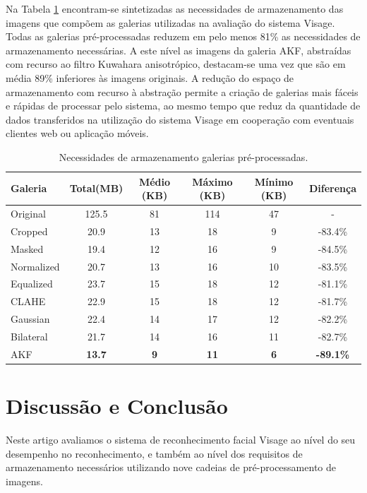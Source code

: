 \documentclass{llncs}
\begin{document}
Na Tabela \ref{tab:tamanho} encontram-se sintetizadas as necessidades de armazenamento das imagens que compõem as galerias utilizadas na avaliação do sistema Visage. Todas as galerias pré-processadas reduzem em pelo menos 81\% as necessidades de armazenamento necessárias. A este nível as imagens da galeria AKF, abstraídas com recurso ao filtro Kuwahara anisotrópico, destacam-se uma vez que são em média 89\% inferiores às imagens originais. A redução do espaço de armazenamento com recurso à abstração permite a criação de galerias mais fáceis e rápidas de processar pelo sistema, ao mesmo tempo que reduz da quantidade de dados transferidos na utilização do sistema Visage em cooperação com eventuais clientes web ou aplicação móveis.
\begin{table}
	\centering
    \caption{Necessidades de armazenamento galerias pré-processadas.}
    \begin{tabular}{l|ccccc}
    Galeria    & Total(MB) & Médio (KB) & Máximo (KB) & Mínimo (KB) & Diferença \\ 
    \hline\hline
    Original   & 125.5   & 81 & 114 & 47 & - \\

    Cropped    & 20.9   & 13 & 18 & 9 & -83.4\% \\
    Masked     & 19.4   & 12 & 16 & 9 & -84.5\% \\  

    Normalized & 20.7   & 13 & 16 & 10& -83.5\% \\  
    Equalized  & 23.7   & 15 & 18 & 12& -81.1\% \\  
    CLAHE      & 22.9   & 15 & 18 & 12& -81.7\% \\  

    Gaussian   & 22.4   & 14 & 17 & 12& -82.2\% \\  
    Bilateral  & 21.7   & 14 & 16 & 11& -82.7\% \\  
    AKF        &\textbf{ 13.7}   & \textbf{9}  & \textbf{11} & \textbf{6} & \textbf{-89.1\%} \\  
    \hline\hline
    \end{tabular}
    \label{tab:tamanho}
\end{table}
\section{Discussão e Conclusão}
Neste artigo avaliamos o sistema de reconhecimento facial Visage ao nível do seu desempenho no reconhecimento, e também ao nível dos requisitos de armazenamento necessários utilizando nove cadeias de pré-processamento de imagens.
\end{document}
